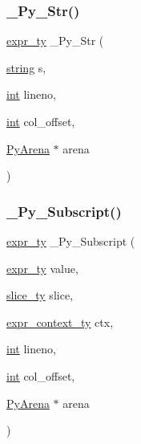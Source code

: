 \mbox{\label{_python-ast_8h_a2e03cfff5f4c8b214e1ca1d61fc3b5cb}} 
\subsubsection{\texorpdfstring{\_Py\_Str()}{\_Py\_Str()}}
{\footnotesize\ttfamily \mbox{\hyperlink{_python-ast_8h_a56d3705e020a071405094a220c4592bd}{expr\+\_\+ty}} \+\_\+\+Py\+\_\+\+Str (\begin{DoxyParamCaption}\item[{\mbox{\hyperlink{asdl_8h_ae84541b4f3d8e1ea24ec0f466a8c568b}{string}}}]{s,  }\item[{\mbox{\hyperlink{warnings_8h_a74f207b5aa4ba51c3a2ad59b219a423b}{int}}}]{lineno,  }\item[{\mbox{\hyperlink{warnings_8h_a74f207b5aa4ba51c3a2ad59b219a423b}{int}}}]{col\+\_\+offset,  }\item[{\mbox{\hyperlink{pyarena_8h_a9edeb357fbb27333471022a0975adb7a}{Py\+Arena}} $\ast$}]{arena }\end{DoxyParamCaption})}

\mbox{\label{_python-ast_8h_a4f0bd3273fab37948889711e668fcc5c}} 
\subsubsection{\texorpdfstring{\_Py\_Subscript()}{\_Py\_Subscript()}}
{\footnotesize\ttfamily \mbox{\hyperlink{_python-ast_8h_a56d3705e020a071405094a220c4592bd}{expr\+\_\+ty}} \+\_\+\+Py\+\_\+\+Subscript (\begin{DoxyParamCaption}\item[{\mbox{\hyperlink{_python-ast_8h_a56d3705e020a071405094a220c4592bd}{expr\+\_\+ty}}}]{value,  }\item[{\mbox{\hyperlink{_python-ast_8h_a1aba5288236679e8faff34c189476bf0}{slice\+\_\+ty}}}]{slice,  }\item[{\mbox{\hyperlink{_python-ast_8h_a38710ce394ed6d5cc8ebe79a322dcdf9}{expr\+\_\+context\+\_\+ty}}}]{ctx,  }\item[{\mbox{\hyperlink{warnings_8h_a74f207b5aa4ba51c3a2ad59b219a423b}{int}}}]{lineno,  }\item[{\mbox{\hyperlink{warnings_8h_a74f207b5aa4ba51c3a2ad59b219a423b}{int}}}]{col\+\_\+offset,  }\item[{\mbox{\hyperlink{pyarena_8h_a9edeb357fbb27333471022a0975adb7a}{Py\+Arena}} $\ast$}]{arena }\end{DoxyParamCaption})}

